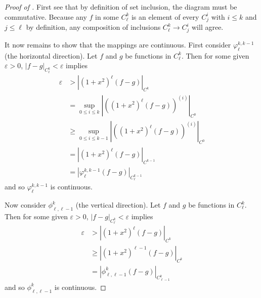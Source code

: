       \begin{proof}[Proof of ]
        First see that by definition of set inclusion, the diagram must be commutative.
        Because any $f$ in some $C^k_\ell$ is an element of every $C^i_j$ with $i\le k$ and $j\le\ell$ by definition, any composition of inclusions $C^k_\ell\rightarrow C^i_j$ will agree.

        It now remains to show that the mappings are continuous.
        First consider $\varphi^{k,k-1}_\ell$ (the horizontal direction).
        Let $f$ and $g$ be functions in $C^k_\ell$.
        Then for some given $\varepsilon>0$, $|f-g|_{C^k_\ell}<\varepsilon$ implies
        \begin{align*}
          \varepsilon &> \left|(1+x^2)^\ell(f-g)\right|_{C^k}
          \\&= \sup_{0\le i\le k} \left|((1+x^2)^\ell(f-g))^{(i)}\right|_{C^0}
          \\&\ge \sup_{0\le i\le k-1} \left|((1+x^2)^\ell(f-g))^{(i)}\right|_{C^0} 
          \\&= \left|(1+x^2)^\ell(f-g)\right|_{C^{k-1}}
          \\&= \left|\varphi^{k,k-1}_\ell(f-g)\right|_{C^{k-1}_\ell}
        \end{align*}
        and so $\varphi^{k,k-1}_\ell$ is continuous.

        Now consider $\phi^k_{\ell,\ell-1}$ (the vertical direction).
        Let $f$ and $g$ be functions in $C^k_\ell$.
        Then for some given $\varepsilon>0$, $|f-g|_{C^k_\ell}<\varepsilon$ implies
        \begin{align*}
          \varepsilon &> \left|(1+x^2)^\ell(f-g)\right|_{C^k}
          \\&\ge \left|(1+x^2)^{\ell-1}(f-g)\right|_{C^k}
          \\&= \left|\phi^k_{\ell,\ell-1}(f-g)\right|_{C^k_{\ell-1}}
        \end{align*}
        and so $\phi^k_{\ell,\ell-1}$ is continuous.
      \end{proof}

